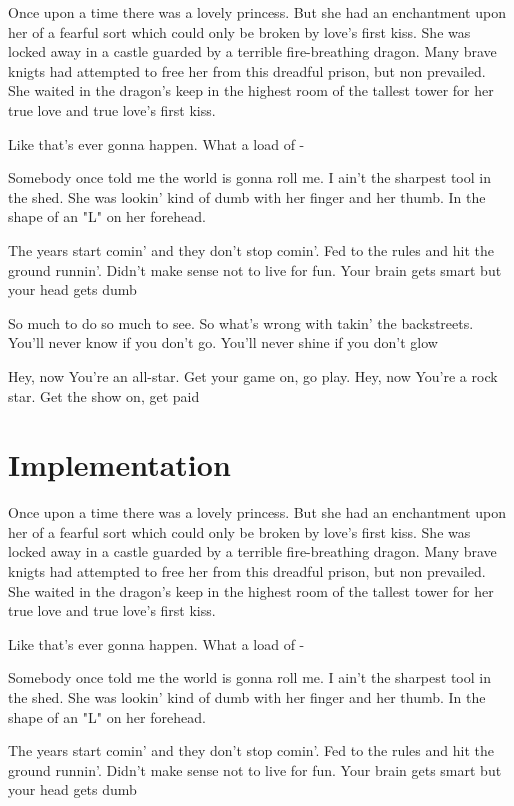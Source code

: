 \documentclass{article}
\begin{document}
Once upon a time there was a lovely princess.  But she had an enchantment upon her of a fearful sort which could only be broken by love's first kiss.  She was locked away in a castle guarded by a terrible fire-breathing dragon.  Many brave knigts had attempted to free her from this dreadful prison, but non prevailed.  She waited in the dragon's keep in the highest room of the tallest tower for her true love and true love's first kiss.

Like that's ever gonna happen.  What a load of - 

Somebody once told me the world is gonna roll me. I ain't the sharpest tool in the shed. She was lookin' kind of dumb with her finger and her thumb.  In the shape of an "L" on her forehead.

The years start comin' and they don't stop comin'. Fed to the rules and hit the ground runnin'.  Didn't make sense not to live for fun.  Your brain gets smart but your head gets dumb

So much to do so much to see. So what's wrong with takin' the backstreets.  You'll never know if you don't go.  You'll never shine if you don't glow 

Hey, now You're an all-star.  Get your game on, go play.  Hey, now You're a rock star.  Get the show on, get paid

\section{Implementation}

Once upon a time there was a lovely princess.  But she had an enchantment upon her of a fearful sort which could only be broken by love's first kiss.  She was locked away in a castle guarded by a terrible fire-breathing dragon.  Many brave knigts had attempted to free her from this dreadful prison, but non prevailed.  She waited in the dragon's keep in the highest room of the tallest tower for her true love and true love's first kiss.

Like that's ever gonna happen.  What a load of - 

Somebody once told me the world is gonna roll me. I ain't the sharpest tool in the shed. She was lookin' kind of dumb with her finger and her thumb.  In the shape of an "L" on her forehead.

The years start comin' and they don't stop comin'. Fed to the rules and hit the ground runnin'.  Didn't make sense not to live for fun.  Your brain gets smart but your head gets dumb
\end{document}

